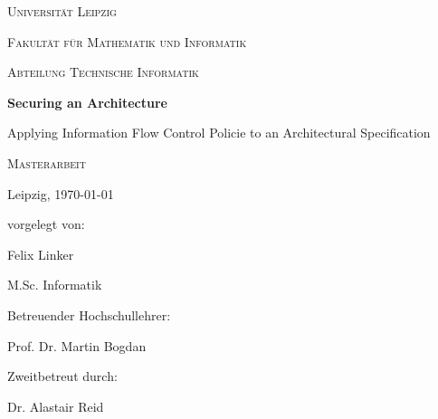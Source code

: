 \documentclass{securem}
\begin{document}
\begin{titlepage}
    \centering
    \par
    \vspace{1cm}
    {\scshape\LARGE Universität Leipzig} \par
    \vspace{0.3cm}
    {\scshape\Large Fakultät für Mathematik und Informatik} \par
    {\scshape\Large Abteilung Technische Informatik} \par
    \vspace{2.3cm}
    {\huge\bfseries Securing an Architecture} \par
    {\Large Applying Information Flow Control Policie to an Architectural Specification} \par
    \vspace{1.5cm}
    {\scshape\Large Masterarbeit} \par
    \vspace{0.3cm}
    {\large Leipzig, \today} \par
    \vspace {1.5cm}
    {
        vorgelegt von: \par
        Felix Linker \par
        M.Sc. Informatik
    }
    \vfill
    \begin{multicols}{2}
        Betreuender Hochschullehrer: \par
        Prof. Dr. Martin Bogdan \par
        \columnbreak
        Zweitbetreut durch: \par
        Dr. Alastair Reid
    \end{multicols}
\end{titlepage}

\newpage

\tableofcontents
\thispagestyle{empty}

\newpage

\setcounter{page}{1}












\end{document}
